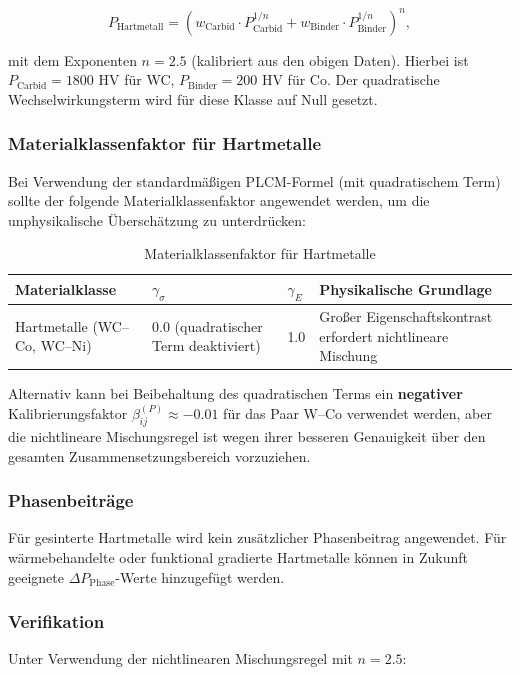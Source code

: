 \documentclass[12pt,a4paper]{article}
\begin{document}
	\[
	P_{\text{Hartmetall}} = \left( w_{\text{Carbid}} \cdot P_{\text{Carbid}}^{1/n} + w_{\text{Binder}} \cdot P_{\text{Binder}}^{1/n} \right)^{n},
	\]
	
	mit dem Exponenten $n = 2.5$ (kalibriert aus den obigen Daten). Hierbei ist $P_{\text{Carbid}} = 1800$ HV für WC, $P_{\text{Binder}} = 200$ HV für Co. Der quadratische Wechselwirkungsterm wird für diese Klasse auf Null gesetzt.
	
	\subsubsection{Materialklassenfaktor für Hartmetalle}
	Bei Verwendung der standardmäßigen PLCM-Formel (mit quadratischem Term) sollte der folgende Materialklassenfaktor angewendet werden, um die unphysikalische Überschätzung zu unterdrücken:
	
	\begin{longtable}{p{3.5cm} p{2.5cm} p{2.5cm} p{5cm}}
		\caption{Materialklassenfaktor für Hartmetalle}\\
		\toprule
		\textbf{Materialklasse} & $\gamma_{\sigma}$ & $\gamma_{E}$ & \textbf{Physikalische Grundlage} \\
		\midrule
		Hartmetalle (WC–Co, WC–Ni) & 0.0 (quadratischer Term deaktiviert) & 1.0 & Großer Eigenschaftskontrast erfordert nichtlineare Mischung \\
		\bottomrule
	\end{longtable}
	
	Alternativ kann bei Beibehaltung des quadratischen Terms ein \textbf{negativer} Kalibrierungsfaktor $\beta_{ij}^{(P)} \approx -0.01$ für das Paar W–Co verwendet werden, aber die nichtlineare Mischungsregel ist wegen ihrer besseren Genauigkeit über den gesamten Zusammensetzungsbereich vorzuziehen.
	
	\subsubsection{Phasenbeiträge}
	Für gesinterte Hartmetalle wird kein zusätzlicher Phasenbeitrag angewendet. Für wärmebehandelte oder funktional gradierte Hartmetalle können in Zukunft geeignete $\Delta P_{\text{Phase}}$-Werte hinzugefügt werden.
	
	\subsubsection{Verifikation}
	Unter Verwendung der nichtlinearen Mischungsregel mit $n=2.5$:
	
\end{document}

